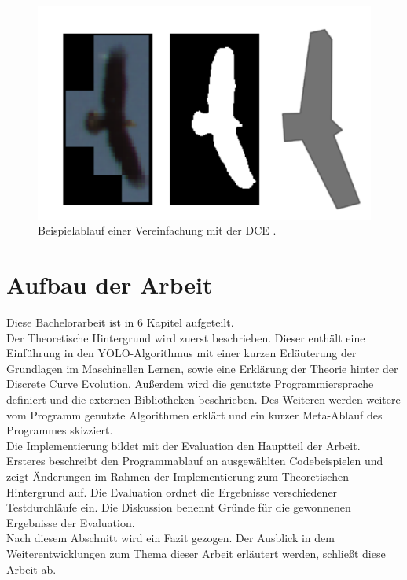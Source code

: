 \begin{figure}[ht]
	\vspace{-0.5cm}
	   \centering
	   \includegraphics*[scale = 0.5, keepaspectratio, trim=2 2 2 2 ]{images/Example_bird.png}
	   \caption[Beispielablauf der Segmentierung und DCE]{Beispielablauf einer Vereinfachung mit der DCE \citep{Dorr2017}.}
	   \label{Bsp_Dorr}
\end{figure}
\section{Aufbau der Arbeit}
{Diese Bachelorarbeit ist in 6 Kapitel aufgeteilt. \\ 
Der Theoretische Hintergrund wird zuerst beschrieben. Dieser enthält eine Einführung in den YOLO-Algorithmus mit einer kurzen Erläuterung der Grundlagen im Maschinellen Lernen, sowie eine Erklärung der Theorie hinter der Discrete Curve Evolution. Außerdem wird die genutzte Programmiersprache definiert und die externen Bibliotheken beschrieben. Des Weiteren werden weitere vom Programm genutzte Algorithmen erklärt und ein kurzer Meta-Ablauf des Programmes skizziert. \\
Die Implementierung bildet mit der Evaluation den Hauptteil der Arbeit. Ersteres beschreibt den Programmablauf an ausgewählten Codebeispielen und zeigt Änderungen im Rahmen der Implementierung zum Theoretischen Hintergrund auf. Die Evaluation ordnet die Ergebnisse verschiedener Testdurchläufe ein. Die Diskussion benennt Gründe für die gewonnenen Ergebnisse der Evaluation. \\
Nach diesem Abschnitt wird ein Fazit gezogen. Der Ausblick in dem Weiterentwicklungen zum Thema dieser Arbeit erläutert werden, schließt diese Arbeit ab. }




